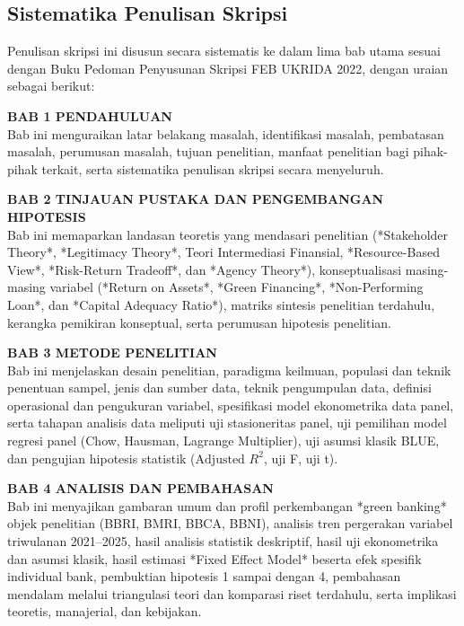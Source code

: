 \documentclass[12pt,a4paper]{article}
\numberwithin{equation}{section}
\begin{document}
\subsection{Sistematika Penulisan Skripsi}

\noindent
Penulisan skripsi ini disusun secara sistematis ke dalam lima bab utama sesuai dengan Buku Pedoman Penyusunan Skripsi FEB UKRIDA 2022, dengan uraian sebagai berikut:

\noindent
\textbf{BAB 1 PENDAHULUAN}\\
Bab ini menguraikan latar belakang masalah, identifikasi masalah, pembatasan masalah, perumusan masalah, tujuan penelitian, manfaat penelitian bagi pihak-pihak terkait, serta sistematika penulisan skripsi secara menyeluruh.

\noindent
\textbf{BAB 2 TINJAUAN PUSTAKA DAN PENGEMBANGAN HIPOTESIS}\\
Bab ini memaparkan landasan teoretis yang mendasari penelitian (*Stakeholder Theory*, *Legitimacy Theory*, Teori Intermediasi Finansial, *Resource-Based View*, *Risk-Return Tradeoff*, dan *Agency Theory*), konseptualisasi masing-masing variabel (*Return on Assets*, *Green Financing*, *Non-Performing Loan*, dan *Capital Adequacy Ratio*), matriks sintesis penelitian terdahulu, kerangka pemikiran konseptual, serta perumusan hipotesis penelitian.

\noindent
\textbf{BAB 3 METODE PENELITIAN}\\
Bab ini menjelaskan desain penelitian, paradigma keilmuan, populasi dan teknik penentuan sampel, jenis dan sumber data, teknik pengumpulan data, definisi operasional dan pengukuran variabel, spesifikasi model ekonometrika data panel, serta tahapan analisis data meliputi uji stasioneritas panel, uji pemilihan model regresi panel (Chow, Hausman, Lagrange Multiplier), uji asumsi klasik BLUE, dan pengujian hipotesis statistik ($\text{Adjusted } R^2$, uji F, uji t).

\noindent
\textbf{BAB 4 ANALISIS DAN PEMBAHASAN}\\
Bab ini menyajikan gambaran umum dan profil perkembangan *green banking* objek penelitian (BBRI, BMRI, BBCA, BBNI), analisis tren pergerakan variabel triwulanan 2021--2025, hasil analisis statistik deskriptif, hasil uji ekonometrika dan asumsi klasik, hasil estimasi *Fixed Effect Model* beserta efek spesifik individual bank, pembuktian hipotesis 1 sampai dengan 4, pembahasan mendalam melalui triangulasi teori dan komparasi riset terdahulu, serta implikasi teoretis, manajerial, dan kebijakan.
\end{document}
